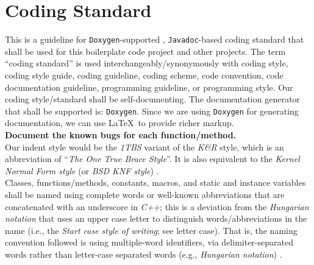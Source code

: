 \documentclass[letter,12pt]{article}
\begin{document}
\section{Coding Standard}
\label{sec:CodingStandard}

This is a guideline for {\tt Doxygen}-supported \cite{vanHeesch2016}, {\tt Javadoc}-based \cite{Long1995} coding standard that shall be used for this boilerplate code project and other projects. The term ``coding standard'' is used interchangeably/synonymously with coding style, coding style guide, coding guideline, coding scheme, code convention, code documentation guideline, programming guideline, or programming style. Our coding style/standard shall be self-documenting. The documentation generator that shall be supported is: {\tt Doxygen}. Since we are using {\tt Doxygen} for generating documentation, we can use \LaTeX\ to provide richer markup. \\

{\bf Document the known bugs for each function/method.} \\

Our indent style would be the {\it 1TBS} variant of the {\it K{\rm \&}R} style, which is an abbreviation of ``{\it The One True Brace Style}''. It is also equivalent to the {\it Kernel Normal Form style} (or {\it BSD KNF style}) \cite{WikipediaContributors2016j}. \\

Classes, functions/methods, constants, macros, and static and instance variables shall be named using complete words or well-known abbreviations that are concatenated with an underscore in {\it C++}; this is a deviation from the {\it Hungarian notation} that uses an upper case letter to distinguish words/abbreviations in the name (i.e., the {\it Start case style of writing}; see letter case). That is, the naming convention followed is using multiple-word identifiers, via delimiter-separated words rather than letter-case separated words (e.g., {\it Hungarian notation}) \cite{WikipediaContributors2017}. \\
\end{document}

